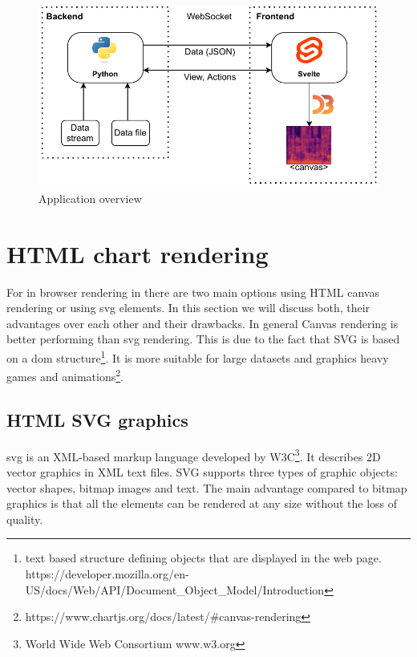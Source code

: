 \begin{figure}
    \centering
    \includegraphics{obrazky/appstack.drawio.pdf}
    \caption{Application overview}
    \label{fig:app_overview}
\end{figure}







\section{HTML chart rendering}

For in browser rendering in there are two main options using HTML canvas rendering or using \ac{svg} elements. In this section we will discuss both, their advantages over each other and their drawbacks. In general Canvas rendering is better performing than \ac{svg} rendering. This is due to the fact that SVG is based on a \ac{dom} structure\footnote{text based structure defining objects that are displayed in the web page. https://developer.mozilla.org/en-US/docs/Web/API/Document\_Object\_Model/Introduction}. It is more suitable for large datasets and graphics heavy games and animations\footnote{https://www.chartjs.org/docs/latest/\#canvas-rendering}.

\subsection{HTML SVG graphics}

\ac{svg} is an XML-based markup language developed by W3C\footnote{World Wide Web Consortium www.w3.org}. It describes 2D vector graphics in XML text files. SVG supports three types of graphic objects: vector shapes, bitmap images and text. The main advantage compared to bitmap graphics is that all the elements can be rendered at any size without the loss of quality. 

